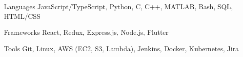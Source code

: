 

\begin{cvskills}

  \cvskill
    {Languages} %
    {JavaScript/TypeScript, Python, C, C++, MATLAB, Bash, SQL, HTML/CSS} %

  \cvskill
    {Frameworks} %
    {React, Redux, Express.js, Node.js, Flutter} %

  \cvskill
    {Tools} %
    {Git, Linux, AWS (EC2, S3, Lambda), Jenkins, Docker, Kubernetes, Jira} %

\end{cvskills}
